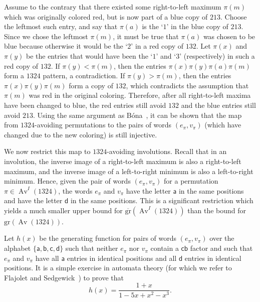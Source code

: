 \documentclass[10pt]{article}
\theoremstyle{plain}
\newcommand{\Av}{\operatorname{Av}}
\newcommand{\ds}{\displaystyle}
\newcommand{\f}[2]{\ds\frac{{#1}}{{#2}}}
\newcommand{\gr}{\mathrm{gr}}
\newcommand{\ugr}{\overline{\mathrm{gr}}}
\renewcommand{\a}{\mathsf{a}}
\renewcommand{\b}{\mathsf{b}}
\renewcommand{\c}{\mathsf{c}}
\renewcommand{\d}{\mathsf{d}}
\begin{document}
Assume to the contrary that there existed some right-to-left maximum $\pi(m)$ which was originally colored red, but is now part of a blue copy of $213$. Choose the leftmost such entry, and say that $\pi(a)$ is the `$1$' in the blue copy of $213$. Since we chose the leftmost $\pi(m)$, it must be true that $\pi(a)$ was chosen to be blue because otherwise it would be the `$2$' in a red copy of $132$. Let $\pi(x)$ and $\pi(y)$ be the entries that would have been the `$1$' and `$3$' (respectively) in such a red copy of $132$. If $\pi(y) < \pi(m)$, then the entries $\pi(x)\pi(y)\pi(a)\pi(m)$ form a $1324$ pattern, a contradiction. If $\pi(y) > \pi(m)$, then the entries $\pi(x)\pi(y)\pi(m)$ form a copy of $132$, which contradicts the assumption that $\pi(m)$ was red in the original coloring. Therefore, after all right-to-left maxima have been changed to blue, the red entries still avoid $132$ and the blue entries still avoid $213$. Using the same argument as B\'ona~\cite{bona:a-new-upper-bou:}, it can be shown that the map from $1324$-avoiding permutations to the pairs of words $(e_\pi,v_\pi)$ (which have changed due to the new coloring) is still injective.

We now restrict this map to $1324$-avoiding involutions. Recall that in an involution, the inverse image of a right-to-left maximum is also a right-to-left maximum, and the inverse image of a left-to-right minimum is also a left-to-right minimum. Hence, given the pair of words $(e_\pi, v_\pi)$ for a permutation $\pi \in \Av^I(1324)$, the words $e_\pi$ and $v_\pi$ have the letter $\a$ in the same positions and have the letter $\d$ in the same positions. This is a significant restriction which yields a much smaller upper bound for $\ugr(\Av^I(1324))$ than the bound for $\gr(\Av(1324))$.

Let $h(x)$ be the generating function for pairs of words $(e_\pi, v_\pi)$ over the alphabet $\{\a,\b,\c,\d\}$ such that neither $e_\pi$ nor $v_\pi$ contain a $\c\b$ factor and such that $e_\pi$ and $v_\pi$ have all $\a$ entries in identical positions and all $\d$ entries in identical positions. It is a simple exercise in automata theory (for which we refer to Flajolet and Sedgewick~{\cite[I.4.2]{flajolet:analytic-combin:}}) to prove that
	\[h(x) = \f{1+x}{1-5x+x^2-x^3}.\]
\end{document}
